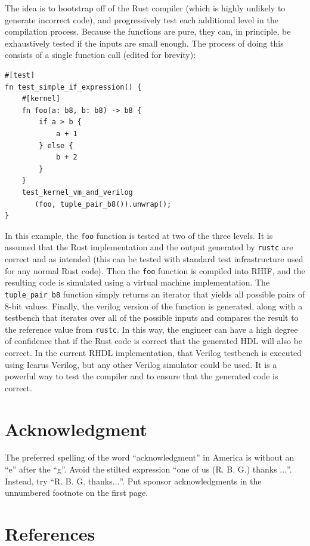 \documentclass[conference]{IEEEtran}
\begin{document}
The idea is to bootstrap off of the Rust compiler (which is highly unlikely to generate incorrect code), and progressively
test each additional level in the compilation process.  Because the functions are pure, they can, in principle, be
exhaustively tested if the inputs are small enough.  The process of doing this consists of a single function call (edited for brevity):

\begin{verbatim}
#[test]
fn test_simple_if_expression() {
    #[kernel]
    fn foo(a: b8, b: b8) -> b8 {
        if a > b {
            a + 1
        } else {
            b + 2
        }
    }
    test_kernel_vm_and_verilog
       (foo, tuple_pair_b8()).unwrap();
}  
\end{verbatim}

In this example, the \verb|foo| function is tested at two of the three levels.  It is assumed that the 
Rust implementation and the output generated by \verb|rustc| are correct and as intended (this can be tested
with standard test infrastructure used for any normal Rust code).  Then the \verb|foo| function is compiled into RHIF, and
the resulting code is simulated using a virtual machine implementation.  The \verb|tuple_pair_b8| function simply returns an
iterator that yields all possible pairs of 8-bit values.  Finally, the verilog version of the function is 
generated, along with a testbench that iterates over all of the possible inputs and compares the result to 
the reference value from \verb|rustc|.  In this way, the engineer can have a high degree of confidence that if the Rust 
code is correct that the generated HDL will also be correct.  In the current RHDL implementation, that Verilog testbench
is executed using Icarus Verilog, but any other Verilog simulator could be used.  It is a powerful way to test 
the compiler and to ensure that the generated code is correct.


\section*{Acknowledgment}

The preferred spelling of the word ``acknowledgment'' in America is without 
an ``e'' after the ``g''. Avoid the stilted expression ``one of us (R. B. 
G.) thanks $\ldots$''. Instead, try ``R. B. G. thanks$\ldots$''. Put sponsor 
acknowledgments in the unnumbered footnote on the first page.

\section*{References}
\end{document}
